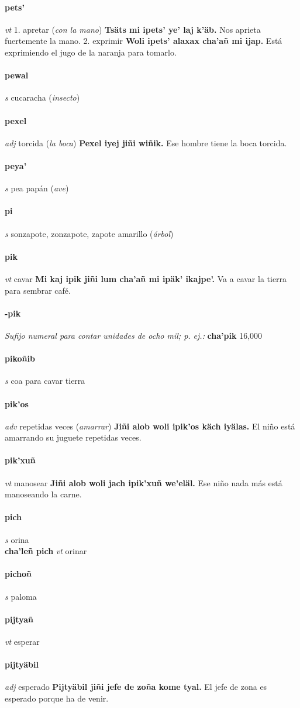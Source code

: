 \documentclass{scrbook}
\newcommand{\entry}[1]{\paragraph{#1}}
\newcommand{\onedefinition}[1]{#1.}
\newcommand{\nontranslationdef}[1]{\textit{#1}}
\newcommand{\partofspeech}[1]{\textit{#1}}
\newcommand{\spanishtranslation}[1]{#1}
\newcommand{\clarification}[1]{(\textit{#1})}
\newcommand{\cholexample}[1]{\textbf{#1}}
\newcommand{\exampletranslation}[1]{#1}
\newcommand{\secondaryentry}[1]{\\\textbf{#1}}
\newcommand{\secondpartofspeech}[1]{\textit{#1}}
\newcommand{\secondtranslation}[1]{#1}
\begin{document}
\begin{multicols}{2}
\entry{pets'}
\partofspeech{vt}
\onedefinition{1}
\spanishtranslation{apretar}
\clarification{con la mano}
\cholexample{Tsäts mi ipets' ye' laj k'äb.}
\exampletranslation{Nos aprieta fuertemente la mano.}
\onedefinition{2}
\spanishtranslation{exprimir}
\cholexample{Woli ipets' alaxax cha'añ mi ijap.}
\exampletranslation{Está exprimiendo el jugo de la naranja para tomarlo.}

\entry{pewal}
\partofspeech{s}
\spanishtranslation{cucaracha}
\clarification{insecto}

\entry{pexel}
\partofspeech{adj}
\spanishtranslation{torcida}
\clarification{la boca}
\cholexample{Pexel iyej jiñi wiñik.}
\exampletranslation{Ese hombre tiene la boca torcida.}

\entry{peya'}
\partofspeech{s}
\spanishtranslation{pea}
\spanishtranslation{papán}
\clarification{ave}

\entry{pi}
\partofspeech{s}
\spanishtranslation{sonzapote, zonzapote, zapote amarillo}
\clarification{árbol}

\entry{pik}
\partofspeech{vt}
\spanishtranslation{cavar}
\cholexample{Mi kaj ipik jiñi lum cha'añ mi ipäk' ikajpe'.}
\exampletranslation{Va a cavar la tierra para sembrar café.}

\entry{-pik}
\nontranslationdef{Sufijo numeral para contar unidades de ocho mil; p. ej.:}
\cholexample{cha'pik}
\exampletranslation{16,000}

\entry{pikoñib}
\partofspeech{s}
\spanishtranslation{coa para cavar tierra}

\entry{pik'os}
\partofspeech{adv}
\spanishtranslation{repetidas veces}
\clarification{amarrar}
\cholexample{Jiñi alob woli ipik'os käch iyälas.}
\exampletranslation{El niño está amarrando su juguete repetidas veces.}

\entry{pik'xuñ}
\partofspeech{vt}
\spanishtranslation{manosear}
\cholexample{Jiñi alob woli jach ipik'xuñ we'eläl.}
\exampletranslation{Ese niño nada más está manoseando la carne.}

\entry{pich}
\partofspeech{s}
\spanishtranslation{orina}
\secondaryentry{cha'leñ pich}
\secondpartofspeech{vt}
\secondtranslation{orinar}

\entry{pichoñ}
\partofspeech{s}
\spanishtranslation{paloma}

\entry{pijtyañ}
\partofspeech{vt}
\spanishtranslation{esperar}

\entry{pijtyäbil}
\partofspeech{adj}
\spanishtranslation{esperado}
\cholexample{Pijtyäbil jiñi jefe de zoña kome tyal.}
\exampletranslation{El jefe de zona es esperado porque ha de venir.}


\end{multicols}
\end{document}
